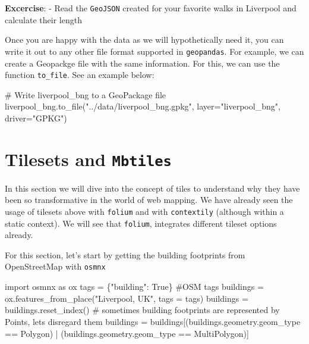 \documentclass[
  letterpaper,
  DIV=11,
  numbers=noendperiod]{scrreprt}
\newenvironment{Shaded}{\begin{snugshade}}{\end{snugshade}}
\newcommand{\CommentTok}[1]{\textcolor[rgb]{0.37,0.37,0.37}{#1}}
\newcommand{\ImportTok}[1]{\textcolor[rgb]{0.00,0.46,0.62}{#1}}
\newcommand{\NormalTok}[1]{\textcolor[rgb]{0.00,0.23,0.31}{#1}}
\newcommand{\OperatorTok}[1]{\textcolor[rgb]{0.37,0.37,0.37}{#1}}
\newcommand{\StringTok}[1]{\textcolor[rgb]{0.13,0.47,0.30}{#1}}
\newcommand{\VariableTok}[1]{\textcolor[rgb]{0.07,0.07,0.07}{#1}}
\begin{document}
\textbf{Excercise}: - Read the \texttt{GeoJSON} created for your
favorite walks in Liverpool and calculate their length

Once you are happy with the data as we will hypothetically need it, you
can write it out to any other file format supported in
\texttt{geopandas}. For example, we can create a Geopackge file with the
same information. For this, we can use the function \texttt{to\_file}.
See an example below:

\begin{Shaded}
\begin{Highlighting}[]
\CommentTok{\# Write \textquotesingle{}liverpool\_bng\textquotesingle{} to a GeoPackage file}
\NormalTok{liverpool\_bng.to\_file(}\StringTok{"../data/liverpool\_bng.gpkg"}\NormalTok{, layer}\OperatorTok{=}\StringTok{"liverpool\_bng"}\NormalTok{, driver}\OperatorTok{=}\StringTok{"GPKG"}\NormalTok{)}
\end{Highlighting}
\end{Shaded}

\section{\texorpdfstring{Tilesets and
\texttt{Mbtiles}}{Tilesets and Mbtiles}}\label{tilesets-and-mbtiles}

In this section we will dive into the concept of tiles to understand why
they have been so transformative in the world of web mapping. We have
already seen the usage of tilesets above with \texttt{folium} and with
\texttt{contextily} (although within a static context). We will see that
\texttt{folium}, integrates different tileset options already.

For this section, let's start by getting the building footprints from
OpenStreetMap with \texttt{osmnx}

\begin{Shaded}
\begin{Highlighting}[]
\ImportTok{import}\NormalTok{ osmnx }\ImportTok{as}\NormalTok{ ox}
\NormalTok{tags }\OperatorTok{=}\NormalTok{ \{}\StringTok{"building"}\NormalTok{: }\VariableTok{True}\NormalTok{\} }\CommentTok{\#OSM tags}
\NormalTok{buildings }\OperatorTok{=}\NormalTok{ ox.features\_from\_place(}\StringTok{"Liverpool, UK"}\NormalTok{, tags }\OperatorTok{=}\NormalTok{ tags) }
\NormalTok{buildings }\OperatorTok{=}\NormalTok{ buildings.reset\_index()}
 \CommentTok{\# sometimes building footprints are represented by Points, let\textquotesingle{}s disregard them}
\NormalTok{buildings }\OperatorTok{=}\NormalTok{ buildings[(buildings.geometry.geom\_type }\OperatorTok{==} \StringTok{\textquotesingle{}Polygon\textquotesingle{}}\NormalTok{) }\OperatorTok{|}\NormalTok{ (buildings.geometry.geom\_type }\OperatorTok{==} \StringTok{\textquotesingle{}MultiPolygon\textquotesingle{}}\NormalTok{)]}
\end{Highlighting}
\end{Shaded}
\end{document}

